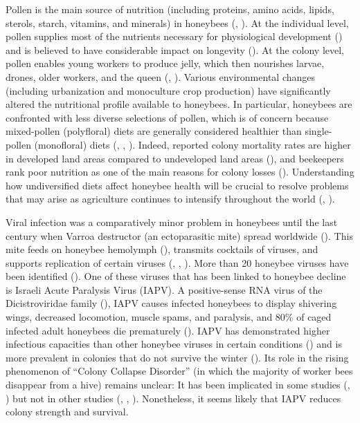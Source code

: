 \documentclass[11pt,a4paper,oldfontcommands,openany]{memoir}
\numberwithin{equation}{section} %
\begin{document}
Pollen is the main source of nutrition (including proteins, amino acids, lipids, sterols, starch, vitamins, and minerals) in honeybees (\citealt{source}, \citealt{source2}). At the individual level, pollen supplies most of the nutrients necessary for physiological development (\citealt{brodschneider}) and is believed to have considerable impact on longevity (\citealt{longevity}). At the colony level, pollen enables young workers to produce jelly, which then nourishes larvae, drones, older workers, and the queen (\citealt{jelly}, \citealt{jelly2}). Various environmental changes (including urbanization and monoculture crop production) have significantly altered the nutritional profile available to honeybees. In particular, honeybees are confronted with less diverse selections of pollen, which is of concern because mixed-pollen (polyfloral) diets are generally considered healthier than single-pollen (monofloral) diets (\citealt{diverse}, \citealt{diverse2}, \citealt{alaux}). Indeed, reported colony mortality rates are higher in developed land areas compared to undeveloped land areas (\citealt{undeveloped}), and beekeepers rank poor nutrition as one of the main reasons for colony losses (\citealt{bkLoss}). Understanding how undiversified diets affect honeybee health will be crucial to resolve problems that may arise as agriculture continues to intensify throughout the world (\citealt{ag}, \citealt{ag2}).

Viral infection was a comparatively minor problem in honeybees until the last century when Varroa destructor (an ectoparasitic mite) spread worldwide (\citealt{miteSpread}). This mite feeds on honeybee hemolymph (\citealt{hemolymph}), transmits cocktails of viruses, and supports replication of certain viruses (\citealt{miteVirus}, \citealt{miteVirus2}, \citealt{miteVirus3}). More than 20 honeybee viruses have been identified (\citealt{numVirus}). One of these viruses that has been linked to honeybee decline is Israeli Acute Paralysis Virus (IAPV). A positive-sense RNA virus of the Dicistroviridae family (\citealt{fam}), IAPV causes infected honeybees to display shivering wings, decreased locomotion, muscle spams, and paralysis, and 80\% of caged infected adult honeybees die prematurely (\citealt{symptoms}). IAPV has demonstrated higher infectious capacities than other honeybee viruses in certain conditions (\citealt{carrillo}) and is more prevalent in colonies that do not survive the winter (\citealt{winter}). Its role in the rising phenomenon of ``Colony Collapse Disorder'' (in which the majority of worker bees disappear from a hive) remains unclear: It has been implicated in some studies (\citealt{iapvCCD}, \citealt{iapvCCD2}) but not in other studies (\citealt{ccd1}, \citealt{iapvCCD3}, \citealt{fam}). Nonetheless, it seems likely that IAPV reduces colony strength and survival.
\end{document}
